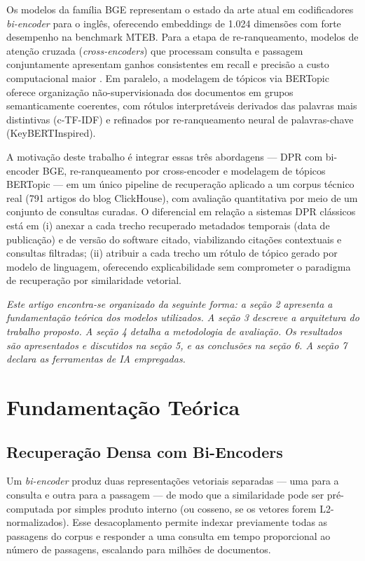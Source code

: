 \documentclass[11pt,a4paper]{article}
\begin{document}
Os modelos da família BGE \cite{xiao2024} representam o estado da arte atual em codificadores \textit{bi-encoder} para o inglês, oferecendo embeddings de 1.024 dimensões com forte desempenho na benchmark MTEB. Para a etapa de re-ranqueamento, modelos de atenção cruzada (\textit{cross-encoders}) que processam consulta e passagem conjuntamente apresentam ganhos consistentes em recall e precisão a custo computacional maior \cite{nogueira2019}. Em paralelo, a modelagem de tópicos via BERTopic \cite{grootendorst2022} oferece organização não-supervisionada dos documentos em grupos semanticamente coerentes, com rótulos interpretáveis derivados das palavras mais distintivas (c-TF-IDF) e refinados por re-ranqueamento neural de palavras-chave (KeyBERTInspired).

A motivação deste trabalho é integrar essas três abordagens --- DPR com bi-encoder BGE, re-ranqueamento por cross-encoder e modelagem de tópicos BERTopic --- em um único pipeline de recuperação aplicado a um corpus técnico real (791 artigos do blog ClickHouse), com avaliação quantitativa por meio de um conjunto de consultas curadas. O diferencial em relação a sistemas DPR clássicos está em (i) anexar a cada trecho recuperado metadados temporais (data de publicação) e de versão do software citado, viabilizando citações contextuais e consultas filtradas; (ii) atribuir a cada trecho um rótulo de tópico gerado por modelo de linguagem, oferecendo explicabilidade sem comprometer o paradigma de recuperação por similaridade vetorial.

\textit{Este artigo encontra-se organizado da seguinte forma: a seção 2 apresenta a fundamentação teórica dos modelos utilizados. A seção 3 descreve a arquitetura do trabalho proposto. A seção 4 detalha a metodologia de avaliação. Os resultados são apresentados e discutidos na seção 5, e as conclusões na seção 6. A seção 7 declara as ferramentas de IA empregadas.}

\section{Fundamentação Teórica}

\subsection{Recuperação Densa com Bi-Encoders}

Um \textit{bi-encoder} produz duas representações vetoriais separadas --- uma para a consulta e outra para a passagem --- de modo que a similaridade pode ser pré-computada por simples produto interno (ou cosseno, se os vetores forem L2-normalizados). Esse desacoplamento permite indexar previamente todas as passagens do corpus e responder a uma consulta em tempo proporcional ao número de passagens, escalando para milhões de documentos.
\end{document}

